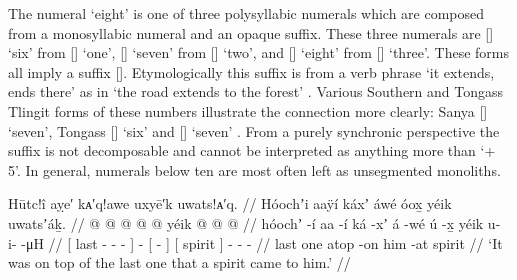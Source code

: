 The numeral  ‘eight’ is one of three polysyllabic numerals which are composed from a monosyllabic numeral and an opaque suffix.
These three numerals are  [] ‘six’ from  [] ‘one’,  [] ‘seven’ from  [] ‘two’, and  [] ‘eight’ from  [] ‘three’.
These forms all imply a suffix  [].
Etymologically this suffix is from a verb phrase  ‘it extends, ends there’ as in  ‘the road extends to the forest’ \parencite[84.1034]{story-naish:1973}.
Various Southern and Tongass Tlingit forms of these numbers illustrate the connection more clearly: Sanya  [] ‘seven’, Tongass  [] ‘six’ and  [] ‘seven’ \parencite[10.101]{leer:1973}.
From a purely synchronic perspective the suffix  is not decomposable and cannot be interpreted as anything more than ‘+ 5’.
In general, numerals below ten are most often left as unsegmented monoliths.

\ex\label{ex:91-40-atop-last-spirit-came}%
%
\begingl
	\glpreamble	Hūtc!î aỵe′ kᴀ′q!awe uxyē′k uwats!ᴀ′q. //
	\glpreamble	Hóochʼi aaÿí káxʼ áwé óox̱ yéik uwatsʼáḵ. //
	\gla	{}  @ {}  @ {}  @ {} {}  @ {}
		{}  @ {} {} 
		{} yéik {}
		 @ {} @ {} @ {} //
	\glb	{} hóochʼ -í aa -í ká -xʼ {} á -wé
		{} ú -x̱ {}
		{} yéik {}
		u- i-  -μH //
	\glc	{}[ last -  -  - {}]  -
		{}[  - {}]
		{}[ spirit {}]
		- -  - //
	\gld	{} last {} one {} atop -on {}  {}
		{} him -at {}
		{} spirit {}
		 {} {} {} //
	\glft	‘It was on top of the last one that a spirit came to him.’
		//
\endgl
\xe

